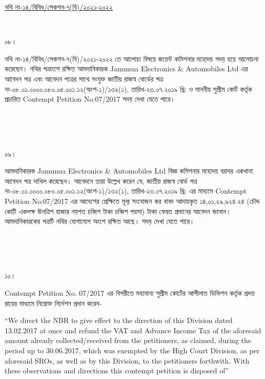 \documentclass[12pt]{article}
\begin{document}
\begin{minipage}[t]{0.59\linewidth}
\hspace{0.5em}
\end{minipage}
\begin{minipage}[t]{1\textwidth}
\underline{নথি নং-১৪/বিবিধ/সেকশন-৭(বি)/২০২১-২০২২}
\end{minipage}
\\
\begin{minipage}[t]{0.05\linewidth}
০৮।
\end{minipage}
\begin{minipage}[t]{1\linewidth}
নথি নং-১৪/বিবিধ/সেকশন-৭(বি)/২০২১-২০২২
তে আলোচ্য বিষয়ে জয়েন্ট কমিশনার মহোদয়
সদয় হয়ে আলোচনা করেছেন।
নথির পত্রাংশে রক্ষিত আমদানিকারক
Jamunua Electronics \& Automobiles Ltd
এর আবেদন পত্র এবং আবেদন পত্রের সাথে সংযুক্ত
জাতীয় রাজস্ব বোর্ডের পত্র
নং-০৮.০১.০০০০.০৮০.০৫.০০১.১২(অংশ-১)/১৩২(১),
তারিখ-২৩.০৭.২০১৯ খ্রি:
ও মাননীয় সুপ্রীম কোর্ট কর্তৃক প্রচারিত
Contempt Petition No:07/2017
সদয় দেখা যেতে পারে।
\end{minipage}
\\
\\
\\
\begin{minipage}[t]{0.05\linewidth}
০৯।
\end{minipage}
\begin{minipage}[t]{1\linewidth}
আমদানিকারক
Jamunua Electronics \& Automobiles Ltd
বিজ্ঞ কমিশনার মহোদয় বরাবর
একখানা আবেদন পত্র দাখিল
করেছেন। আবেদনে তারা উল্লেখ করেন যে,
জাতীয় রাজস্ব বোর্ড পত্র
নং-০৮.০১.০০০০.০৮০.০৫.০০১.১২(অংশ-১)/১৩২(১),
তারিখ-২৩.০৭.২০১৯ খ্রি:
এর মাধ্যমে
Contempt Petition No:07/2017
এর আদেশের প্রেক্ষিতে মূল্য সংযোজন কর
বাবদ আদায়কৃত
১৪,০১,২৯,৯২৪.২৪
(চৌদ্দ কোটি একলক্ষ ঊনত্রিশ হাজার নয়শত চব্বিশ টাকা চব্বিশ পয়সা) টাকা
ফেরত প্রদানের আবেদন জানান।
আমদানিকারকের পত্রটি নথির যোগাযোগ
অংশে রক্ষিত আছে।
সদয় দেখা যেতে পারে।
\end{minipage}
\\
\\
\\
\begin{minipage}[t]{0.05\linewidth}
১০।
\end{minipage}
\begin{minipage}[t]{1\linewidth}
Contempt Petition No. 07/2017
এর বিপরীতে মহামান্য সুপ্রীম কোর্টের
আপীলাত ডিভিশন কর্তৃক প্রদত্ত রায়ের
মাধ্যমে নিম্নোক্ত নির্দেশন প্রদান করেন-


\hspace{1em}``We direct the NBR
to give effect to the direction
of this Division
dated 13.02.2017
at once and refund the VAT
and Advance Income Tax
of the aforesaid amount already
collected/received from the
petitioners, as claimed, during
the period up to 30.06.2017,
which was exempted by the
High Court Division, as per
aforesaid SROs, as well as by this
Division, to the  petitioners
forthwith. With these observations
and directions this contempt
petition is disposed of''
\end{minipage}
\end{document}
